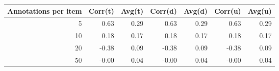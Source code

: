 \begin{tabular}{rrrrrrr}
\toprule
Annotations per item & Corr(t) & Avg(t) & Corr(d) & Avg(d) & Corr(u) & Avg(u) \\
\midrule
5 & 0.63 & 0.29 & 0.63 & 0.29 & 0.63 & 0.29 \\
10 & 0.18 & 0.17 & 0.18 & 0.17 & 0.18 & 0.17 \\
20 & -0.38 & 0.09 & -0.38 & 0.09 & -0.38 & 0.09 \\
50 & -0.00 & 0.04 & -0.00 & 0.04 & -0.00 & 0.04 \\
\bottomrule
\end{tabular}
